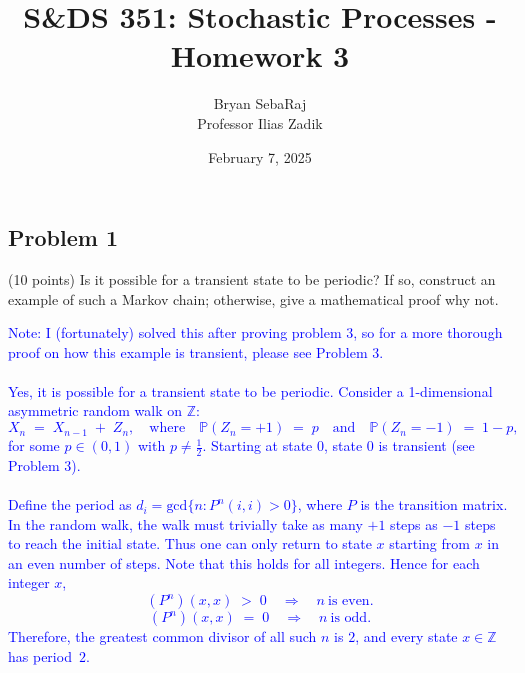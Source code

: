 \documentclass{article}
\title{S\&DS 351: Stochastic Processes - Homework 3}
\author{Bryan SebaRaj \\[0.8em] Professor Ilias Zadik}
\date{February 7, 2025}
\begin{document}
\maketitle

\subsection*{Problem 1} (10 points) Is it possible for a transient state to be periodic? If so, construct an example of such a Markov chain; otherwise, give a mathematical proof why not.

\textcolor{blue}{Note: I (fortunately) solved this after proving problem 3, so for a more thorough proof on how this example is transient, please see Problem 3. \\ \\ 
Yes, it is possible for a transient state to be periodic. Consider a 1-dimensional asymmetric random walk on $\mathbb{Z}$:
\[
   X_{n} \;=\; X_{n-1} \;+\; Z_n,
   \quad\text{where}\quad
   \mathbb{P}(Z_n = +1) \;=\; p
   \quad\text{and}\quad
   \mathbb{P}(Z_n = -1) \;=\; 1 - p,
\]
for some $p \in (0,1)$ with $p \neq \tfrac{1}{2}$. Starting at state 0, state 0 is transient (see Problem 3). \\ \\ 
\smallskip
\noindent
Define the period as $d_i = \text{gcd}\{n:P^n(i,i)>0\}$, where $P$ is the transition matrix. \\
In the random walk, the walk must trivially take as many $+1$ steps as $-1$ steps to reach the initial state. Thus one can only return to state $x$ starting from $x$ in an even number of steps. Note that this holds for all integers. Hence for each integer $x$, 
\[
  (P^n)(x,x) \;>\;0 
  \quad\Longrightarrow\quad 
  n \ \text{is even}.
\]
\[
  (P^n)(x,x) \;=\;0 
  \quad\Longrightarrow\quad 
  n \ \text{is odd}.
\]
Therefore, the greatest common divisor of all such $n$ is $2$, and every state $x\in\mathbb{Z}$ has period~$2$.
}
   
\end{document}
